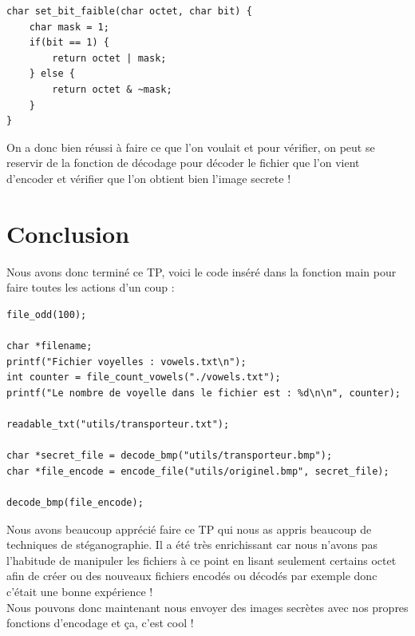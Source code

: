 \documentclass[12pt]{article}
\begin{document}
\begin{lstlisting}[style=languageClarge, caption=Fonction \texttt{set\_bit\_faible}]
char set_bit_faible(char octet, char bit) {
    char mask = 1;
    if(bit == 1) {
        return octet | mask;
    } else {
        return octet & ~mask;
    }
}
\end{lstlisting}

On a donc bien réussi à faire ce que l'on voulait et pour vérifier, on peut se reservir de la fonction de décodage pour décoder le fichier que l'on vient d'encoder et vérifier que l'on obtient bien l'image secrete !

\section{Conclusion}
Nous avons donc terminé ce TP, voici le code inséré dans la fonction main pour faire toutes les actions d'un coup :
\begin{lstlisting}[style=languageClarge, caption=Fonction main]
file_odd(100);

char *filename;
printf("Fichier voyelles : vowels.txt\n");
int counter = file_count_vowels("./vowels.txt");
printf("Le nombre de voyelle dans le fichier est : %d\n\n", counter);

readable_txt("utils/transporteur.txt");

char *secret_file = decode_bmp("utils/transporteur.bmp");
char *file_encode = encode_file("utils/originel.bmp", secret_file);

decode_bmp(file_encode);
\end{lstlisting}

Nous avons beaucoup apprécié faire ce TP qui nous as appris beaucoup de techniques de stéganographie. Il a été très enrichissant car nous n'avons pas l'habitude de manipuler les fichiers à ce point en lisant seulement certains octet afin de créer ou des nouveaux fichiers encodés ou décodés par exemple donc c'était une bonne expérience ! \\
Nous pouvons donc maintenant nous envoyer des images secrètes avec nos propres fonctions d'encodage et ça, c'est cool !
\end{document}
